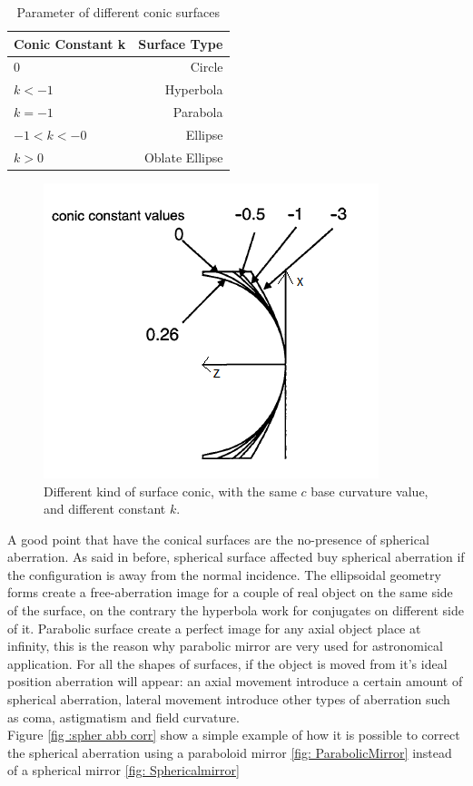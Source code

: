 \begin{table}[ht]
	\centering
		\begin{tabular}{l|r}
			Conic Constant k & Surface Type\\
			\hline
			0 & Circle \\
			$k < -1 $ & Hyperbola \\
			$k = -1 $ & Parabola \\
			$-1 < k < -0 $ & Ellipse \\
			$k > 0 $ & Oblate Ellipse \\	
		\end{tabular}
	\caption{Parameter of different conic surfaces}
	\label{tab: conic surface}
\end{table}
\begin{figure}[]
%
\centering
%
\includegraphics[width=.4\textwidth]{Immagini/Chapter2/SurfaceConic1}
%
\caption{Different kind of surface conic, with the same $c $ base curvature value, and different constant $k $.}
%
\label{fig: SurfaceConic1}
%
\end{figure}
\noindent A good point that have the conical surfaces are the no-presence of spherical aberration. As said in before, spherical surface affected buy spherical aberration if the configuration is away from the normal incidence. The ellipsoidal geometry forms create a free-aberration image for a couple of real object on the same side of the surface, on the contrary the hyperbola work for conjugates on different side of it. Parabolic surface create a perfect image for any axial object place at infinity, this is the reason why parabolic mirror are very used for astronomical application. For all the shapes of surfaces, if the object is moved from it's ideal position aberration will appear: an axial movement introduce a certain amount of spherical aberration, lateral movement introduce other types of aberration such as coma, astigmatism and field curvature.
\\
\noindent 
Figure \ref{fig :spher abb corr} show a simple example of how it is possible to correct the spherical aberration using a paraboloid mirror \ref{fig: ParabolicMirror} instead of a spherical mirror \ref{fig: Sphericalmirror}
